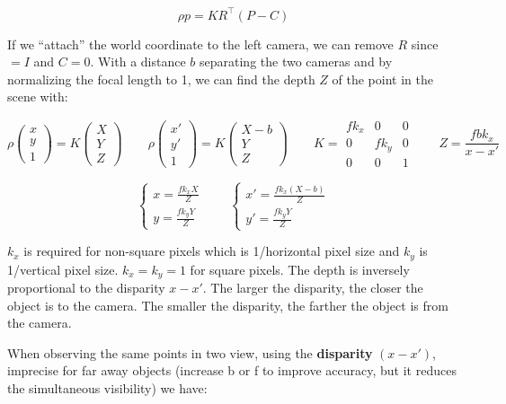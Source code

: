 \documentclass[
  a4paper,
  ,captions=tableheading
]{scrartcl}
\begin{document}
\[
\rho p = K R^\top (P-C)
\]

If we ``attach'' the world coordinate to the left camera, we can remove
\(R\) since \(=I\) and \(C=0\). With a distance \(b\) separating the two
cameras and by normalizing the focal length to 1, we can find the depth
\(Z\) of the point in the scene with:

\[
\rho \begin{pmatrix}
    x\\
    y\\
    1
\end{pmatrix} = K \begin{pmatrix}
    X\\
    Y\\
    Z
\end{pmatrix} \qquad \rho \begin{pmatrix}
    x'\\
    y'\\
    1
\end{pmatrix} = K \begin{pmatrix}
    X-b\\
    Y\\
    Z
\end{pmatrix} \qquad K = \begin{matrix}
    fk_x & 0 & 0\\
    0 & fk_y & 0\\
    0 & 0 & 1
\end{matrix} \qquad Z = \frac{fbk_x}{x-x'}
\]

\begin{equation}
\begin{cases}
    x = \frac{fk_x X}{Z}\\
    y = \frac{fk_y Y}{Z}
    
\end{cases} \qquad \begin{cases}
    x' = \frac{fk_x (X-b)}{Z}\\
    y' = \frac{fk_y Y}{Z}
\end{cases}
\end{equation}

\(k_x\) is required for non-square pixels which is 1/horizontal pixel
size and \(k_y\) is 1/vertical pixel size. \(k_x=k_y=1\) for square
pixels. The depth is inversely proportional to the disparity \(x-x'\).
The larger the disparity, the closer the object is to the camera. The
smaller the disparity, the farther the object is from the camera.

When observing the same points in two view, using the \textbf{disparity}
\((x-x')\), imprecise for far away objects (increase b or f to improve
accuracy, but it reduces the simultaneous visibility) we have:
\end{document}
